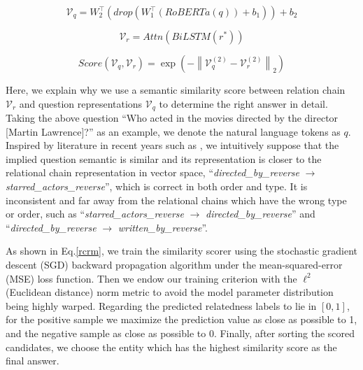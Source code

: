 \documentclass[pdflatex,sn-mathphys]{sn-jnl}%
\theoremstyle{thmstyleone}%
\theoremstyle{thmstyletwo}%
\theoremstyle{thmstylethree}%
\begin{document}
\begin{equation}
\label{rcrmq}
\mathcal{V}_{q} = W_{2}^{\top}(drop(W_{1}^{\top}(RoBERTa(q))+b_{1}))+b_{2}
\end{equation}

\begin{equation}
\label{rcrmr}
\mathcal{V}_{r} = Attn(BiLSTM(r^{*}))
\end{equation}

\begin{equation}
\label{rcrm}
 Score(\mathcal{V}_{q},\mathcal{V}_{r}) = \exp \left(-\left\|\mathcal{V}_{q}^{(2)}-\mathcal{V}_{r}^{(2)}\right\|_{2}\right)
\end{equation}

Here, we explain why we use a semantic similarity score between relation chain $\mathcal{V}_{r}$ and question representations $\mathcal{V}_{q}$ to determine the right answer in detail. Taking the above question ``Who acted in the movies directed by the director [Martin Lawrence]?'' as an example, we denote the natural language tokens as $q$. Inspired by literature in recent years such as \cite{pmlrv162das22a,fu2020surveyQA}, we intuitively 
suppose that the implied question semantic is similar and its representation is closer to the relational chain representation in vector space, ``\textit{directed\_by\_reverse} $\rightarrow$ \textit{starred\_actors\_reverse}'', which is correct in both order and type. It is inconsistent and far away from the relational chains which have the wrong type or order, such as ``\textit{starred\_actors\_reverse} 
$\rightarrow$ \textit{directed\_by\_reverse}'' and ``\textit{directed\_by\_reverse} $\rightarrow$ \textit{written\_by\_reverse}''.

As shown in Eq.\ref{rcrm}, we train the similarity scorer using the stochastic gradient descent (SGD) backward propagation algorithm under the mean-squared-error (MSE) loss function. Then we endow our training criterion with the $\ell^{2}$ (Euclidean distance) norm metric to avoid the model parameter distribution being highly warped. Regarding the predicted relatedness labels to lie in $[0, 1]$, for the positive sample we maximize the prediction value as close as possible to 1, and the negative sample as close as possible to 0. Finally, after sorting the scored candidates, we choose the entity which has the highest similarity score as the final answer.
\end{document}
